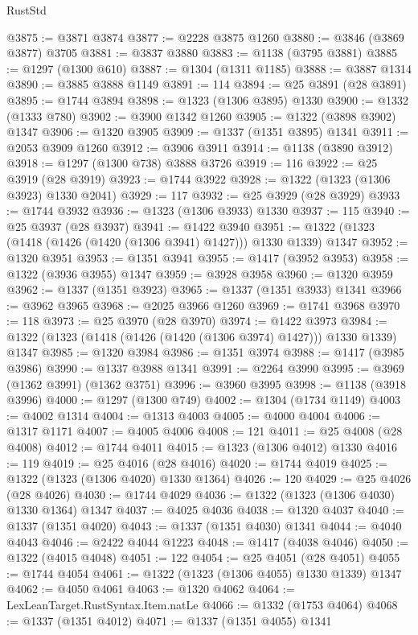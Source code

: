 \begin{lexlean}{RustStd}
\begin{coremodule}
@3875 := @3871 @3874
@3877 := @2228 @3875 @1260
@3880 := @3846 (@3869 @3877) @3705
@3881 := @3837 @3880
@3883 := @1138 (@3795 @3881)
@3885 := @1297 (@1300 @610)
@3887 := @1304 (@1311 @1185)
@3888 := @3887 @1314
@3890 := @3885 @3888 @1149
@3891 := 114
@3894 := @25 @3891 (@28 @3891)
@3895 := @1744 @3894
@3898 := @1323 (@1306 @3895) @1330
@3900 := @1332 (@1333 @780)
@3902 := @3900 @1342 @1260
@3905 := @1322 (@3898 @3902) @1347
@3906 := @1320 @3905
@3909 := @1337 (@1351 @3895) @1341
@3911 := @2053 @3909 @1260
@3912 := @3906 @3911
@3914 := @1138 (@3890 @3912)
@3918 := @1297 (@1300 @738) @3888 @3726
@3919 := 116
@3922 := @25 @3919 (@28 @3919)
@3923 := @1744 @3922
@3928 := @1322 (@1323 (@1306 @3923) @1330 @2041)
@3929 := 117
@3932 := @25 @3929 (@28 @3929)
@3933 := @1744 @3932
@3936 := @1323 (@1306 @3933) @1330
@3937 := 115
@3940 := @25 @3937 (@28 @3937)
@3941 := @1422 @3940
@3951 := @1322 (@1323 (@1418 (@1426 (@1420 (@1306 @3941) @1427))) @1330 @1339) @1347
@3952 := @1320 @3951
@3953 := @1351 @3941
@3955 := @1417 (@3952 @3953)
@3958 := @1322 (@3936 @3955) @1347
@3959 := @3928 @3958
@3960 := @1320 @3959
@3962 := @1337 (@1351 @3923)
@3965 := @1337 (@1351 @3933) @1341
@3966 := @3962 @3965
@3968 := @2025 @3966 @1260
@3969 := @1741 @3968
@3970 := 118
@3973 := @25 @3970 (@28 @3970)
@3974 := @1422 @3973
@3984 := @1322 (@1323 (@1418 (@1426 (@1420 (@1306 @3974) @1427))) @1330 @1339) @1347
@3985 := @1320 @3984
@3986 := @1351 @3974
@3988 := @1417 (@3985 @3986)
@3990 := @1337 @3988 @1341
@3991 := @2264 @3990
@3995 := @3969 (@1362 @3991) (@1362 @3751)
@3996 := @3960 @3995
@3998 := @1138 (@3918 @3996)
@4000 := @1297 (@1300 @749)
@4002 := @1304 (@1734 @1149)
@4003 := @4002 @1314
@4004 := @1313 @4003
@4005 := @4000 @4004
@4006 := @1317 @1171
@4007 := @4005 @4006
@4008 := 121
@4011 := @25 @4008 (@28 @4008)
@4012 := @1744 @4011
@4015 := @1323 (@1306 @4012) @1330
@4016 := 119
@4019 := @25 @4016 (@28 @4016)
@4020 := @1744 @4019
@4025 := @1322 (@1323 (@1306 @4020) @1330 @1364)
@4026 := 120
@4029 := @25 @4026 (@28 @4026)
@4030 := @1744 @4029
@4036 := @1322 (@1323 (@1306 @4030) @1330 @1364) @1347
@4037 := @4025 @4036
@4038 := @1320 @4037
@4040 := @1337 (@1351 @4020)
@4043 := @1337 (@1351 @4030) @1341
@4044 := @4040 @4043
@4046 := @2422 @4044 @1223
@4048 := @1417 (@4038 @4046)
@4050 := @1322 (@4015 @4048)
@4051 := 122
@4054 := @25 @4051 (@28 @4051)
@4055 := @1744 @4054
@4061 := @1322 (@1323 (@1306 @4055) @1330 @1339) @1347
@4062 := @4050 @4061
@4063 := @1320 @4062
@4064 := LexLeanTarget.RustSyntax.Item.natLe
@4066 := @1332 (@1753 @4064)
@4068 := @1337 (@1351 @4012)
@4071 := @1337 (@1351 @4055) @1341

\end{coremodule}
\end{lexlean}
